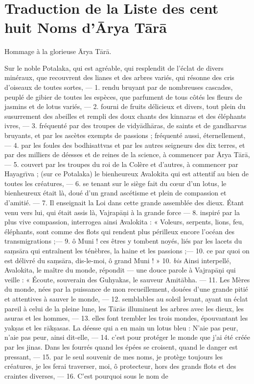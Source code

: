 \documentclass[a4paper, 11pt, oneside, french]{article}
\begin{document}
\section{Traduction de la Liste des cent huit Noms d'\={A}rya T\={a}r\={a}}
\paragraph{}
Hommage à la glorieuse \={A}rya T\={a}r\={a}.

\bigskip

Sur le noble Potalaka, qui est agréable, qui resplendit de l'éclat de divers minéraux, que recouvrent des lianes et des arbres variés, qui résonne des cris d'oiseaux de toutes sortes, --- 1. rendu bruyant par de nombreuses cascades, peuplé de gibier de toutes les espèces, que parfument de tous côtés les fleurs de jasmins et de lotus variés, --- 2. fourni de fruits délicieux et divers, tout plein du susurrement des abeilles et rempli des doux chants des kinnaras et des éléphants ivres, --- 3. fréquenté par des troupes de vidy\={a}dh\={a}ras, de saints et de gandharvas bruyants, et par les ascètes exempts de passions ; fréquenté aussi, éternellement, --- 4. par les foules des bodhisattvas et par les autres seigneurs des dix terres, et par des milliers de déesses et de reines de la science, à commencer par \={A}rya T\={a}r\={a}, --- 5. couvert par les troupes du roi de la Colère et d'autres, à commencer par Hayagr\={\i}va ; (sur ce Potalaka) le bienheureux Avalokita qui est attentif au bien de toutes les créatures, --- 6. se tenant sur le siège fait du cœur d'un lotus, le bienheureux était là, doué d'un grand ascétisme et plein de compassion et d'amitié. --- 7. Il enseignait la Loi dans cette grande assemblée des dieux. Étant venu vers lui, qui était assis là, Vajrap\={a}\d{n}i à la grande force --- 8. inspiré par la plus vive compassion, interrogea ainsi Avalokita : « Voleurs, serpents, lions, feu, éléphants, sont comme des flots qui rendent plus périlleux encore l'océan des transmigrations ;--- 9. ô Muni ! ces êtres y tombent noyés, liés par les lacets du sa\d{m}s\={a}ra qui entraînent les ténèbres, la haine et les passions ;--- 10. ce par quoi on est délivré du sa\d{m}s\={a}ra, dis-le-moi, ô grand Muni ! » 10. \emph{bis} Ainsi interpellé, Avalokita, le maître du monde, répondit --- une douce parole à Vajrap\={a}\d{n}i qui veille : « Écoute, souverain des Guhyakas, le sauveur Amit\={a}bha. --- 11. Les Mères du monde, nées par la puissance de mon recueillement, douées d'une grande pitié et attentives à sauver le monde, --- 12. semblables au soleil levant, ayant un éclat pareil à celui de la pleine lune, les T\={a}r\={a}s illuminent les arbres avec les dieux, les asuras et les hommes, --- 13. elles font trembler les trois mondes, épouvantant les yak\d{s}as et les r\={a}k\d{s}asas. La déesse qui a en main un lotus bleu : N'aie pas peur, n'aie pas peur, ainsi dit-elle, --- 14. c'est pour protéger le monde que j'ai été créée par les jinas. Dans les fourrés quand les épées se croisent, quand le danger est pressant, --- 15. par le seul souvenir de mes noms, je protège toujours les créatures, je les ferai traverser, moi, ô protecteur, hors des grands flots et des craintes diverses, --- 16. C'est pourquoi sous le nom de 
\end{document}
